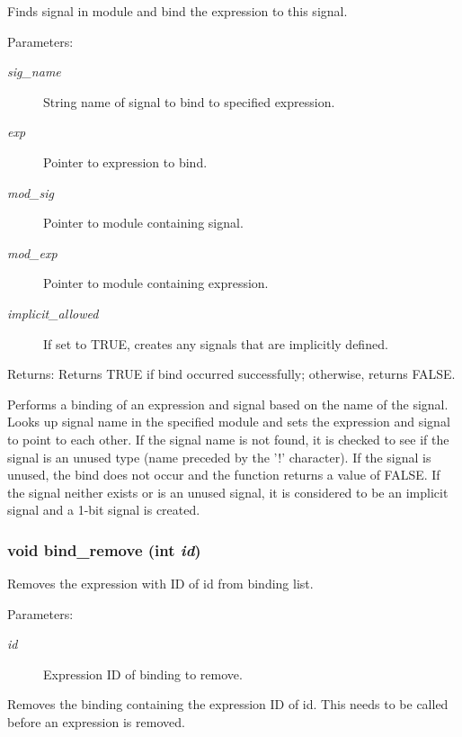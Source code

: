 Finds signal in module and bind the expression to this signal. 

\begin{Desc}
\item[Parameters:]
\begin{description}
\item[{\em sig\_\-name}]String name of signal to bind to specified expression. \item[{\em exp}]Pointer to expression to bind. \item[{\em mod\_\-sig}]Pointer to module containing signal. \item[{\em mod\_\-exp}]Pointer to module containing expression. \item[{\em implicit\_\-allowed}]If set to TRUE, creates any signals that are implicitly defined.\end{description}
\end{Desc}
\begin{Desc}
\item[Returns:]Returns TRUE if bind occurred successfully; otherwise, returns FALSE.\end{Desc}
Performs a binding of an expression and signal based on the name of the signal. Looks up signal name in the specified module and sets the expression and signal to point to each other. If the signal name is not found, it is checked to see if the signal is an unused type (name preceded by the '!' character). If the signal is unused, the bind does not occur and the function returns a value of FALSE. If the signal neither exists or is an unused signal, it is considered to be an implicit signal and a 1-bit signal is created. 
\subsubsection{\setlength{\rightskip}{0pt plus 5cm}void bind\_\-remove (int {\em id})}\label{binding_8c_a6}


Removes the expression with ID of id from binding list. 

\begin{Desc}
\item[Parameters:]
\begin{description}
\item[{\em id}]Expression ID of binding to remove.\end{description}
\end{Desc}
Removes the binding containing the expression ID of id. This needs to be called before an expression is removed. 

